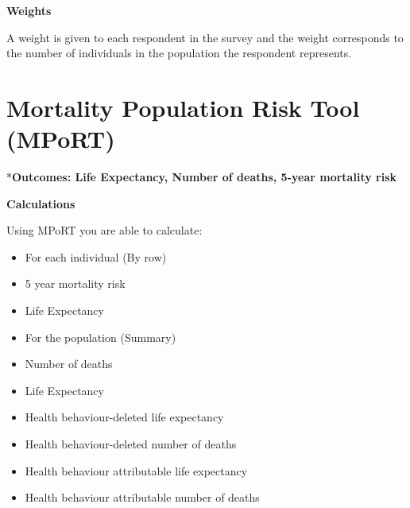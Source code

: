 \documentclass[]{book}
\begin{document}
\textbf{Weights}

A weight is given to each respondent in the survey and the weight
corresponds to the number of individuals in the population the
respondent represents.














































\appendix


\hypertarget{mport}{\chapter{Mortality Population Risk Tool
(MPoRT)}\label{mport}}

*\textbf{Outcomes: Life Expectancy, Number of deaths, 5-year mortality
risk}

\textbf{Calculations}

Using MPoRT you are able to calculate:

\begin{itemize}
\item
  For each individual (By row)
\item
  5 year mortality risk
\item
  Life Expectancy
\item
  For the population (Summary)
\item
  Number of deaths
\item
  Life Expectancy
\item
  Health behaviour-deleted life expectancy
\item
  Health behaviour-deleted number of deaths
\item
  Health behaviour attributable life expectancy
\item
  Health behaviour attributable number of deaths
\end{itemize}
\end{document}
